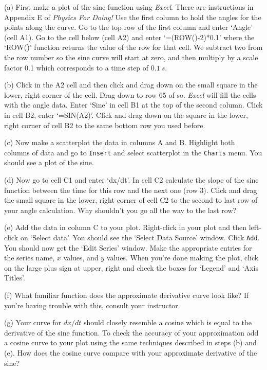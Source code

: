 (a) First make a plot of the sine function using {\it Excel}. 
There are instructions in Appendix E of {\it Physics For Doing!}
Use the first column to hold the angles for the points along the curve.
Go to the top row of the first column and
enter `Angle' (cell A1).
Go to the cell below (cell A2) and enter `=(ROW()-2)*0.1' where the
`ROW()' function returns the value of the row for that cell. We subtract two from
the row number so the sine curve will start at zero, and then multiply by a
scale factor 0.1 which corresponds to a time step of $0.1~s$.

(b) Click in the A2 cell and then click and drag down on the small square in the lower, right corner
of the cell. Drag down to row 65 of so.
{\it Excel} will fill the cells with the angle data.
Enter `Sine' in cell B1 at the top of the second column.
Click in cell B2, enter `=SIN(A2)'.
Click and drag down on the square in the lower, right corner of cell B2 to the same bottom row 
you used before.

(c) Now make a scatterplot the data in columns A and B. Highlight both columns of data and 
go to {\tt Insert} and select scatterplot in the {\tt Charts} menu. You should see 
a plot of the sine.

\pagebreak 

(d) Now go to cell C1 and enter `dx/dt'. In cell C2 calculate the slope of the sine
function between the time for this row and the next one (row 3).
Click and drag the small square in the lower, right corner of
cell C2 to the second to last row of your angle calculation.
Why shouldn't you go all the way to the last row?

\vspace{1.8cm}

(e) Add the data in column C to your plot. Right-click in your plot and then left-click
on `Select data'. You should see the `Select Data Source' window. Click {\tt Add}.
You should now get the `Edit Series' window. Make the appropriate entries
for the series name, $x$ values, and $y$ values.
When you're done making the plot, click on the large plus sign at upper, right and check
the boxes for `Legend' and `Axis Titles'.

(f) What familiar function does the approximate derivative curve look like?
If you're having trouble with this, consult your instructor.

\vspace{1.8cm}

(g) Your curve for $dx/dt$ should closely resemble a cosine which is equal
to the derivative of the sine function.
To check the accuracy of your approximation add a cosine curve to your plot
using the same techniques described in steps (b) and (e). 
How does the cosine curve compare with your approximate derivative of the sine?

